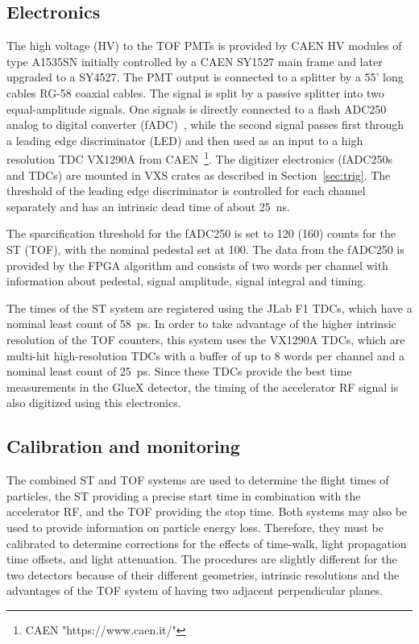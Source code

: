 \subsection{Electronics \label{sec:scelectronics}}
The high voltage (HV) to the TOF PMTs is provided by CAEN HV modules of type A1535SN initially controlled by a CAEN SY1527 main frame and
later upgraded to a SY4527.
The PMT output is connected to a splitter by a 55' long cables RG-58 coaxial cables. The signal is split by
a passive splitter into two equal-amplitude signals. One signals is directly connected to a flash ADC250
analog to digital converter (fADC)~\cite{Dong:2007}, while the second signal passes first through a leading edge discriminator (LED) and then used as an input to a high resolution TDC VX1290A from CAEN~\footnote{CAEN "https://www.caen.it/"}. The digitizer electronics (fADC250s and TDCs) are mounted in VXS crates as described in Section~\ref{sec:trig}.
The threshold of the leading edge discriminator is controlled for each channel separately and has an intrinsic
dead time of about 25~ns.

The sparcification threshold for the fADC250 is set to 120 (160) counts for the ST (TOF), with the nominal pedestal set at 100. The data from the fADC250 is provided by the FPGA algorithm and consists
of two words per channel with information about pedestal, signal amplitude, signal integral and timing.

The times of the ST system are registered using the JLab F1 TDCs, which have a nominal least count of 58~ps. In order to take advantage of the higher intrinsic resolution of the TOF counters, this system uses the VX1290A TDCs, which are multi-hit high-resolution TDCs with a buffer of up to 8 words per channel and a nominal least count of 25~ps. Since these TDCs provide the best time measurements in the GlueX detector, the timing of the accelerator RF signal is also
digitized using this electronics.

\subsection{Calibration and monitoring \label{sec:sccalib}}
The combined ST and TOF systems are used to determine the flight times of particles, the ST providing a precise start time in combination with the accelerator RF, and the TOF providing the stop time. Both systems may also be used to provide information on particle energy loss. Therefore, they must be 
calibrated to determine corrections for the effects of
time-walk, light propagation time offsets, and light attenuation. The procedures are slightly different for the two detectors because of their different geometries, intrinsic resolutions and the advantages of the TOF system of having two adjacent perpendicular planes. 

